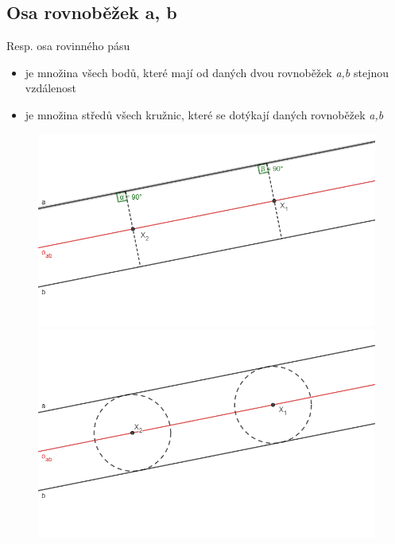 \documentclass[12pt, a4paper]{article}
\begin{document}
\subsection*{Osa rovnoběžek a, b}
Resp. osa rovinného pásu\\
\begin{itemize}
\item je množina všech bodů, které mají od daných dvou rovnoběžek \textit{a,b} stejnou vzdálenost
\item je množina středů všech kružnic, které se dotýkají daných rovnoběžek \textit{a,b}
\end{itemize}

\begin{figure}[H]
\centering
\begin{minipage}{0.5\textwidth}
\includegraphics[scale=0.47]{osarovnobezek1}
\end{minipage}%
\vspace{3cm}
\begin{minipage}{0.5\textwidth}
\includegraphics[scale=0.47]{osarovnobezek2}
\end{minipage}
\end{figure}
\end{document}
